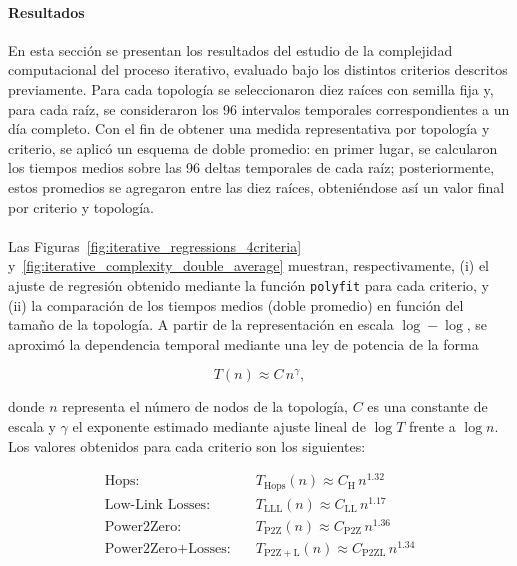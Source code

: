 \paragraph{Resultados} En esta sección se presentan los resultados del estudio de la complejidad computacional del proceso iterativo, evaluado bajo los distintos criterios descritos previamente. Para cada topología se seleccionaron diez raíces con semilla fija y, para cada raíz, se consideraron los 96 intervalos temporales correspondientes a un día completo. Con el fin de obtener una medida representativa por topología y criterio, se aplicó un esquema de doble promedio: en primer lugar, se calcularon los tiempos medios sobre las 96 deltas temporales de cada raíz; posteriormente, estos promedios se agregaron entre las diez raíces, obteniéndose así un valor final por criterio y topología.\\
\\
Las Figuras~\ref{fig:iterative_regressions_4criteria} y~\ref{fig:iterative_complexity_double_average} muestran, respectivamente, (i) el ajuste de regresión obtenido mediante la función \texttt{polyfit} para cada criterio, y (ii) la comparación de los tiempos medios (doble promedio) en función del tamaño de la topología. A partir de la representación en escala \(\log\!-\!\log\), se aproximó la dependencia temporal mediante una ley de potencia de la forma

\begin{equation}
    T(n) \approx C \, n^{\gamma},
\end{equation}

donde \(n\) representa el número de nodos de la topología, \(C\) es una constante de escala y \(\gamma\) el exponente estimado mediante ajuste lineal de \(\log T\) frente a \(\log n\). Los valores obtenidos para cada criterio son los siguientes:

\begin{equation}
\begin{aligned}
    \text{Hops:} \quad & T_{\mathrm{Hops}}(n) \approx C_{\mathrm{H}} \, n^{1.32}\\
    \text{Low-Link Losses:} \quad & T_{\mathrm{LLL}}(n) \approx C_{\mathrm{LL}} \, n^{1.17}\\
    \text{Power2Zero:} \quad & T_{\mathrm{P2Z}}(n) \approx C_{\mathrm{P2Z}} \, n^{1.36}\\
    \text{Power2Zero+Losses:} \quad & T_{\mathrm{P2Z+L}}(n) \approx C_{\mathrm{P2ZL}} \, n^{1.34}
\end{aligned}
\end{equation}

